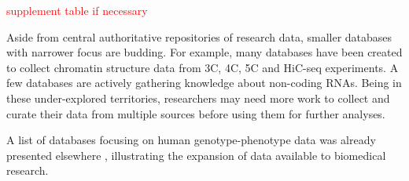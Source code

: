 \documentclass[letter]{bioinfo}
\newcommand{\comment}[1]{\textcolor{red}{#1}}
\begin{document}
\comment{supplement table if necessary}

Aside from central authoritative repositories of research data, smaller databases with narrower focus are budding. For example, many databases have been created to collect chromatin structure data from 3C, 4C, 5C and HiC-seq experiments. A few databases are actively gathering knowledge about non-coding RNAs. Being in these under-explored territories, researchers may need more work to collect and curate their data from multiple sources before using them for further analyses.



A list of databases focusing on human genotype-phenotype data was already presented elsewhere \citep{Brookes:2015:Human}, illustrating the expansion of data available to biomedical research. 
\end{document}
